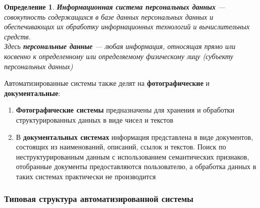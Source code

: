 \documentclass{article}
\newtheorem{definition}{Определение}
\begin{document}
\begin{definition}

\textbf{Информационная система персональных данных} — совокупность содержащихся в базе данных персональных данных и обеспечивающих их обработку информационных технологий и вычислительных средств. \\[1mm]

Здесь \textbf{персональные данные} — любая информация, относящая прямо или косвенно к определенному или определяемому физическому лицу (субъекту персональных данных)

\end{definition}

Автоматизированные системы также делят на \textbf{фотографические} и \textbf{документальные}:

\begin{enumerate}
	\item \textbf{Фотографические системы} предназначены для хранения и обработки структурированных данных в виде чисел и текстов
	\item В \textbf{документальных системах} информация представлена в виде документов, состоящих из наименований, описаний, ссылок и текстов. Поиск по неструктурированным данным с использованием семантических признаков, отобранные документы предоставляются пользователю, а обработка данных в таких системах практически не производится
\end{enumerate}

\subsubsection{Типовая структура автоматизированной системы}
\end{document}
